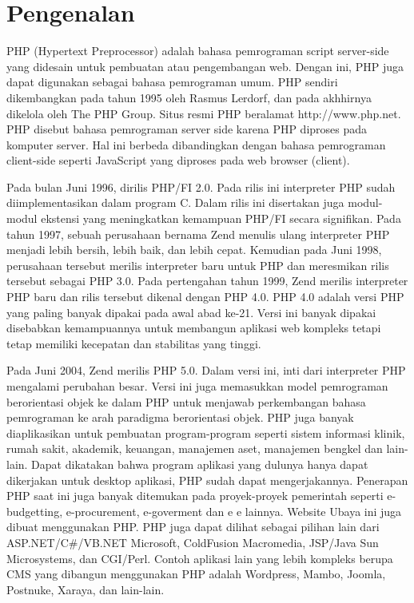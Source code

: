 \section{Pengenalan}
PHP (Hypertext Preprocessor) adalah bahasa pemrograman script server-side yang didesain untuk pembuatan atau pengembangan web.
Dengan ini, PHP juga dapat digunakan sebagai bahasa pemrograman umum. PHP sendiri dikembangkan pada tahun 1995
oleh Rasmus Lerdorf, dan pada akhhirnya dikelola oleh The PHP Group. Situs resmi PHP beralamat http://www.php.net.
PHP disebut bahasa pemrograman server side karena PHP diproses pada komputer server. 
Hal ini berbeda dibandingkan dengan bahasa pemrograman client-side seperti JavaScript yang diproses pada web browser (client).
\par
Pada bulan Juni 1996, dirilis PHP/FI 2.0. Pada rilis ini interpreter PHP sudah diimplementasikan dalam program C. Dalam rilis ini disertakan juga modul-modul ekstensi yang meningkatkan kemampuan PHP/FI secara signifikan. Pada tahun 1997, sebuah perusahaan bernama Zend menulis ulang interpreter PHP menjadi lebih bersih, lebih baik, dan lebih cepat. Kemudian pada Juni 1998, perusahaan tersebut merilis interpreter baru untuk PHP dan meresmikan rilis tersebut sebagai PHP 3.0.
Pada pertengahan tahun 1999, Zend merilis interpreter PHP baru dan rilis tersebut dikenal dengan PHP 4.0. PHP 4.0 adalah versi PHP yang paling banyak dipakai pada awal abad ke-21. Versi ini banyak dipakai disebabkan kemampuannya untuk membangun aplikasi web kompleks tetapi tetap memiliki kecepatan dan stabilitas yang tinggi.
\par
Pada Juni 2004, Zend merilis PHP 5.0. Dalam versi ini, inti dari interpreter PHP mengalami perubahan besar. Versi ini juga memasukkan model pemrograman berorientasi objek ke dalam PHP untuk menjawab perkembangan bahasa pemrograman ke arah paradigma berorientasi objek. PHP juga banyak diaplikasikan untuk pembuatan program-program seperti sistem informasi  klinik, rumah sakit, akademik, keuangan, manajemen aset, manajemen bengkel dan lain-lain. Dapat dikatakan bahwa program aplikasi yang dulunya hanya dapat dikerjakan untuk desktop aplikasi, PHP sudah dapat mengerjakannya. Penerapan PHP saat ini juga banyak ditemukan pada proyek-proyek pemerintah seperti e-budgetting, e-procurement, e-goverment dan e e lainnya. Website Ubaya ini juga dibuat menggunakan PHP. PHP juga dapat dilihat sebagai pilihan lain dari ASP.NET/C#/VB.NET Microsoft, ColdFusion Macromedia, JSP/Java Sun Microsystems, dan CGI/Perl. Contoh aplikasi lain yang lebih kompleks berupa CMS yang dibangun menggunakan PHP adalah Wordpress, Mambo, Joomla, Postnuke, Xaraya, dan lain-lain.


